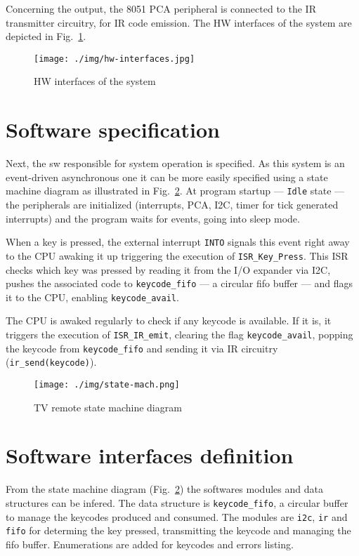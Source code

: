 Concerning the output, the 8051 PCA peripheral is connected to the IR
transmitter circuitry, for IR code emission. The HW interfaces of the system are
depicted in Fig.~\ref{fig:hw-interfaces}.
%
  \vspace{-5mm}
%  
\begin{figure}[htb!]
\centering
    \texttt{[image: ./img/hw-interfaces.jpg]}
  \caption{HW interfaces of the system}%
\label{fig:hw-interfaces}
\end{figure}
%
%
  \vspace{-5mm}
%  
\section{Software specification}
\label{sec:sw-specs}
Next, the \gls{sw} responsible for system operation is specified. As this system
is an event-driven asynchronous one it can be more easily specified using a
state machine diagram as illustrated in Fig.~\ref{fig:state-mach}. At program
startup --- \texttt{Idle} state --- the peripherals are initialized (interrupts, PCA, I2C, timer for tick
generated interrupts) and the program waits for events, going into sleep
mode.

When a key is pressed, the external interrupt \texttt{INTO} signals this
event right away to the CPU awaking it up triggering the execution of
\texttt{ISR\_Key\_Press}. This ISR checks which key was pressed by reading it
from the I/O expander via I2C, pushes the associated code to
\texttt{keycode\_fifo} --- a circular \gls{fifo} buffer --- and flags it to the CPU, enabling \texttt{keycode\_avail}.

The CPU is awaked regularly to check if any keycode is available. If it is, it
triggers the execution of \texttt{ISR\_IR\_emit}, clearing the flag
\texttt{keycode\_avail}, popping the keycode from \texttt{keycode\_fifo} and
sending it via IR circuitry (\texttt{ir\_send(keycode)}).
%
  \vspace{-5mm}
%  
\begin{figure}[htb!]
\centering
    \texttt{[image: ./img/state-mach.png]}
  \caption{TV remote state machine diagram}%
\label{fig:state-mach}
\end{figure}
%
  \vspace{-5mm}
%  
\section{Software interfaces definition}
\label{sec:sw-interf-def}
%
From the state machine diagram (Fig.~\ref{fig:state-mach}) the softwares modules
and data structures can be infered. The data structure is \texttt{keycode\_fifo},
a circular buffer to manage the keycodes produced and consumed. The modules are
\texttt{i2c}, \texttt{ir} and \texttt{fifo} for determing the key pressed,
transmitting the keycode and managing the \gls{fifo} buffer. Enumerations are
added for keycodes and errors listing.


